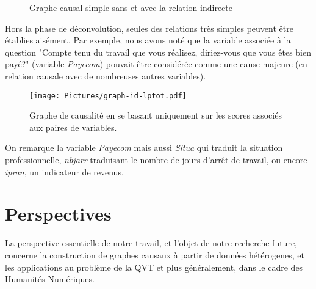 \documentclass[11pt,fleqn,openany,frenchb]{book} %
\def\NOTE#1{\footnote{MS : #1}}
\begin{document}
\begin{figure}[!h]
  \centering
  \hspace{1pt}
  \caption{Graphe causal simple sans et avec la relation indirecte}
  \label{fig:graph-in-direct}
\end{figure}

Hors la phase de déconvolution, seules des relations très simples peuvent être établies aisément. Par exemple, nous avons noté que la variable associée à la question "Compte tenu du travail que vous réalisez, diriez-vous que vous êtes bien payé?" (variable \textit{Payecom}) pouvait être considérée comme une cause majeure (en relation causale avec de nombreuses autres variables).

\begin{figure}[!h]
\centering
 \texttt{[image: Pictures/graph-id-lptot.pdf]}
 \caption{Graphe de causalité en se basant uniquement sur les scores associés aux paires de variables.}
\label{fig:graph-ind-lp}
\end{figure}
 On remarque la variable \textit{Payecom} mais aussi \textit{Situa} qui traduit la situation professionnelle, \textit{nbjarr} traduisant le nombre de jours d'arrêt de travail, ou encore \textit{ipran}, un indicateur de revenus.

\chapter{Perspectives}

La perspective essentielle de notre travail, et l'objet de notre recherche future, concerne la construction de graphes causaux à partir de données hétérogenes, et les applications au problème de la QVT et plus généralement, dans le cadre des Humanités Numériques.
\end{document}
